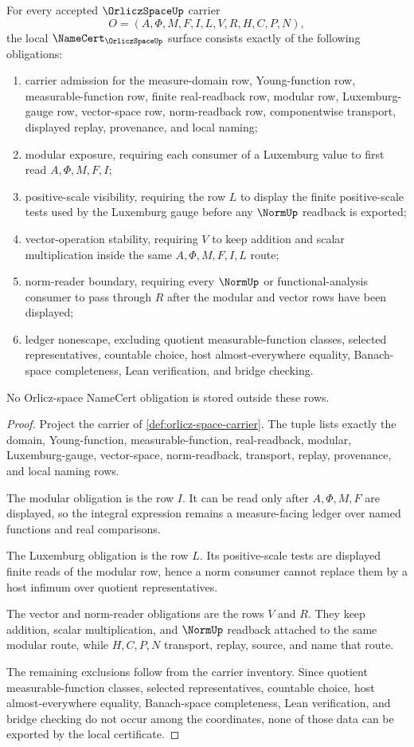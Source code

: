\begin{theorem}
\label{thm:orlicz-space-namecert-obligations}
For every accepted $\OrliczSpaceUp$ carrier
$$
O=(A,\Phi,M,F,I,L,V,R,H,C,P,N),
$$
the local $\NameCert_{\OrliczSpaceUp}$ surface consists exactly of the following obligations:
\begin{enumerate}
\item carrier admission for the measure-domain row, Young-function row, measurable-function row, finite real-readback row, modular row, Luxemburg-gauge row, vector-space row, norm-readback row, componentwise transport, displayed replay, provenance, and local naming;
\item modular exposure, requiring each consumer of a Luxemburg value to first read $A,\Phi,M,F,I$;
\item positive-scale visibility, requiring the row $L$ to display the finite positive-scale tests used by the Luxemburg gauge before any $\NormUp$ readback is exported;
\item vector-operation stability, requiring $V$ to keep addition and scalar multiplication inside the same $A,\Phi,M,F,I,L$ route;
\item norm-reader boundary, requiring every $\NormUp$ or functional-analysis consumer to pass through $R$ after the modular and vector rows have been displayed;
\item ledger nonescape, excluding quotient measurable-function classes, selected representatives, countable choice, host almost-everywhere equality, Banach-space completeness, Lean verification, and bridge checking.
\end{enumerate}
No Orlicz-space NameCert obligation is stored outside these rows.
\end{theorem}
\begin{proof}
Project the carrier of \autoref{def:orlicz-space-carrier}. The tuple lists exactly the domain, Young-function, measurable-function, real-readback, modular, Luxemburg-gauge, vector-space, norm-readback, transport, replay, provenance, and local naming rows.

The modular obligation is the row $I$. It can be read only after $A,\Phi,M,F$ are displayed, so the integral expression remains a measure-facing ledger over named functions and real comparisons.

The Luxemburg obligation is the row $L$. Its positive-scale tests are displayed finite reads of the modular row, hence a norm consumer cannot replace them by a host infimum over quotient representatives.

The vector and norm-reader obligations are the rows $V$ and $R$. They keep addition, scalar multiplication, and $\NormUp$ readback attached to the same modular route, while $H,C,P,N$ transport, replay, source, and name that route.

The remaining exclusions follow from the carrier inventory. Since quotient measurable-function classes, selected representatives, countable choice, host almost-everywhere equality, Banach-space completeness, Lean verification, and bridge checking do not occur among the coordinates, none of those data can be exported by the local certificate.
\end{proof}

